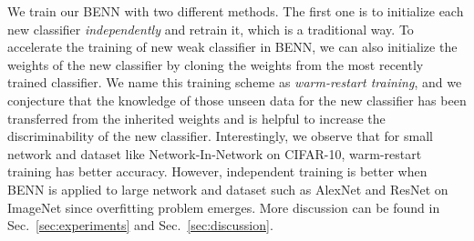 \documentclass[10pt,twocolumn,letterpaper]{article}
\begin{document}
We train our BENN with two different methods. The first one is to initialize each new classifier \emph{independently} and retrain it, which is a traditional way. To accelerate the training of new weak classifier in BENN, we can also initialize the weights of the new classifier by cloning the weights from the most recently trained classifier. We name this training scheme as \emph{warm-restart training}, and we conjecture that the knowledge of those unseen data for the new classifier has been transferred from the inherited weights and is helpful to increase the discriminability of the new classifier.  %
Interestingly, we observe that for small network and dataset like Network-In-Network \cite{lin2013network} on CIFAR-10, warm-restart training has better accuracy. However, independent training is better when BENN is applied to large network and dataset such as AlexNet \cite{krizhevsky2012imagenet} and ResNet \cite{he2016deep} on ImageNet since overfitting problem emerges. More discussion can be found in Sec.~\ref{sec:experiments} and Sec.~\ref{sec:discussion}.
\vspace{-4mm}
\end{document}
